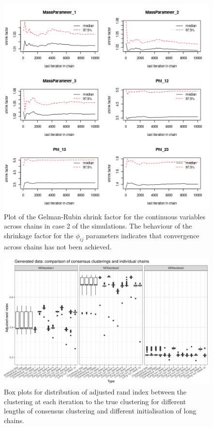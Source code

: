 \documentclass[12pt]{article} %
\begin{document}
	
	\begin{figure}[!htb]
			\centering
			\includegraphics[scale=0.65]{Images/Gen_data/Case_2/Gelman_plot_burn_20000.png}
			\caption{Plot of the  Gelman-Rubin shrink factor for the continuous variables across chains in case 2 of the simulations. The behaviour of the shrinkage factor for the $\phi_{ij}$ parameters indicates that convergence across chains has not been achieved.}
			\label{fig:gen_data_case_2_gelman_plot}
		\end{figure}
	
	
		\begin{figure}
		\centering
		\includegraphics[scale=0.9]{Images/Gen_data/Case_2/box_plot_ari_true_clustering.png}
		\caption{Box plots for distribution of adjusted rand index between the clustering at each iteration to the true clustering for different lengths of consensus clustering and different initialisation of long chains.}
		\label{fig:gen_data_case_2_boxplot}
	\end{figure}
\end{document}
